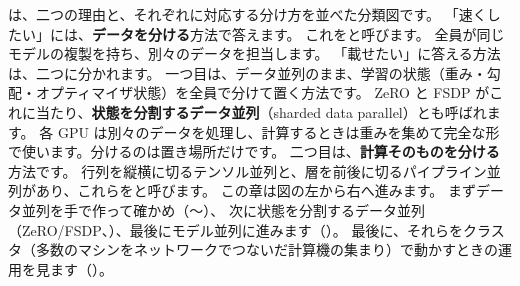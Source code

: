 は、二つの理由と、それぞれに対応する分け方を並べた分類図です。
「速くしたい」には、\textbf{データを分ける}方法で答えます。
これをと呼びます。
全員が同じモデルの複製を持ち、別々のデータを担当します。
「載せたい」に答える方法は、二つに分かれます。
一つ目は、データ並列のまま、学習の状態（重み・勾配・オプティマイザ状態）を全員で分けて置く方法です。
ZeRO と FSDP がこれに当たり、\textbf{状態を分割するデータ並列}（sharded data parallel）とも呼ばれます。
各 GPU は別々のデータを処理し、計算するときは重みを集めて完全な形で使います。分けるのは置き場所だけです。
二つ目は、\textbf{計算そのものを分ける}方法です。
行列を縦横に切るテンソル並列と、層を前後に切るパイプライン並列があり、これらをと呼びます。
この章は図の左から右へ進みます。
まずデータ並列を手で作って確かめ（〜）、
次に状態を分割するデータ並列（ZeRO/FSDP、）、最後にモデル並列に進みます（）。
最後に、それらをクラスタ（多数のマシンをネットワークでつないだ計算機の集まり）で動かすときの運用を見ます（）。

